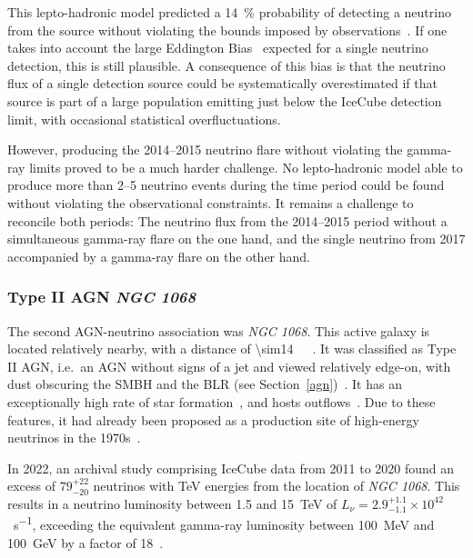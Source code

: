 This lepto-hadronic model predicted a \SI{14}{\percent} probability of detecting a neutrino from the source without violating the bounds imposed by observations~\cite{Gao2018}. If one takes into account the large Eddington Bias~ expected for a single neutrino detection, this is still plausible. A consequence of this bias is that the neutrino flux of a single detection source could be systematically overestimated if that source is part of a large population emitting just below the IceCube detection limit, with occasional statistical overfluctuations.

However, producing the 2014--2015 neutrino flare without violating the gamma-ray limits proved to be a much harder challenge. No lepto-hadronic model able to produce more than 2--5 neutrino events during the time period could be found~ without violating the observational constraints. It remains a challenge to reconcile both periods: The neutrino flux from the 2014--2015 period without a simultaneous gamma-ray flare on the one hand, and the single neutrino from 2017 accompanied by a gamma-ray flare on the other hand.

\subsubsection{Type II AGN \emph{NGC 1068}}
The second AGN-neutrino association was \emph{NGC 1068}. This active galaxy is located relatively nearby, with a distance of \SI{\sim14}{\mega\parsec}~. It was classified as Type II AGN, i.e.\ an AGN without signs of a jet and viewed relatively edge-on, with dust obscuring the SMBH and the BLR (see Section~\ref{agn})~. It has an exceptionally high rate of star formation~, and hosts outflows~. Due to these features, it had already been proposed as a production site of high-energy neutrinos in the 1970s~.

In 2022, an archival study comprising IceCube data from 2011 to 2020 found an excess of $79^{+22}_{-20}$ neutrinos with \unit{\tera\eV} energies from the location of \emph{NGC 1068}. This results in a neutrino luminosity between 1.5 and \SI{15}{\tera\eV} of $L_\nu = 2.9^{+1.1}_{-1.1}\times 10^{42}\,$\unit{\erg\per\s}, exceeding the equivalent gamma-ray luminosity between \SI{100}{\mega\eV} and \SI{100}{\giga\eV} by a factor of 18~.

